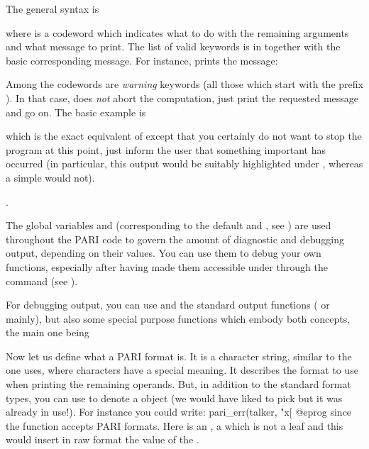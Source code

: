 \noindent
The general syntax is


\noindent where  is a codeword which indicates what to do with
the remaining arguments and what message to print. The list of valid keywords
is in  together with the basic corresponding
message. For instance,  prints the message:


\noindent
Among the codewords are \emph{warning} keywords (all those which start with
the prefix ). In that case,  does \emph{not} abort the
computation, just print the requested message and go on. The basic example is


\noindent which is the exact equivalent of  except that
you certainly do not want to stop the program at this point, just inform the
user that something important has occurred (in particular, this output would be
suitably highlighted under , whereas a simple  would not).

.\label{se:dbg_output}

\noindent
The global variables  and  (corresponding
to the default  and , see )
are used throughout the PARI code to govern the amount of diagnostic and
debugging output, depending on their values. You can use them to debug your
own functions, especially after having made them accessible under  through
the command  (see ).

For debugging output, you can use  and the standard output
functions ( or  mainly), but also some special purpose
functions which embody both concepts, the main one being


\noindent
Now let us define what a PARI format is. It is a character string, similar
to the one  uses, where \kbd{\%} characters have a special
meaning. It describes the format to use when printing the remaining operands.
But, in addition to the standard format types, you can use  to
denote a  object (we would have liked to pick  but it was
already in use!). For instance you could write:
\bprog
pari_err(talker, "x[%
@eprog
\noindent since the  function accepts PARI formats. Here 
is an ,  a  which is not a leaf and this would
insert in raw format the value of the  .

